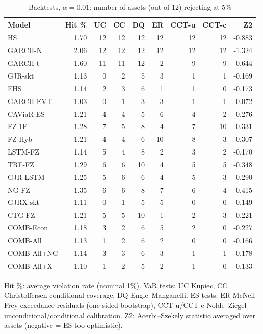 \begin{table}[htbp]
\centering
\footnotesize
\caption{Backtests, $\alpha=0.01$: number of assets (out of 12) rejecting at 5\%}
\label{tab:bt_a010}
\begin{tabular}{lrrrrrrrr}
\toprule
Model & Hit \% & UC & CC & DQ & ER & CCT-u & CCT-c & Z2 \\
\midrule
HS & 1.70 & 12 & 12 & 12 & 12 & 12 & 12 & -0.883 \\
GARCH-N & 2.06 & 12 & 12 & 12 & 12 & 12 & 12 & -1.324 \\
GARCH-t & 1.60 & 11 & 11 & 12 & 2 & 9 & 9 & -0.644 \\
GJR-skt & 1.13 & 0 & 2 & 5 & 3 & 1 & 1 & -0.169 \\
FHS & 1.14 & 2 & 3 & 6 & 1 & 1 & 0 & -0.173 \\
GARCH-EVT & 1.03 & 0 & 1 & 3 & 3 & 1 & 1 & -0.072 \\
CAViaR-ES & 1.21 & 4 & 4 & 5 & 6 & 4 & 2 & -0.276 \\
FZ-1F & 1.28 & 7 & 5 & 8 & 4 & 7 & 10 & -0.331 \\
FZ-Hyb & 1.21 & 4 & 4 & 6 & 10 & 8 & 3 & -0.307 \\
LSTM-FZ & 1.14 & 5 & 4 & 8 & 2 & 3 & 2 & -0.170 \\
TRF-FZ & 1.29 & 6 & 6 & 10 & 4 & 5 & 5 & -0.348 \\
GJR-LSTM & 1.25 & 5 & 6 & 6 & 4 & 5 & 3 & -0.290 \\
NG-FZ & 1.35 & 6 & 6 & 8 & 7 & 6 & 4 & -0.415 \\
GJRX-skt & 1.11 & 0 & 1 & 5 & 5 & 0 & 0 & -0.149 \\
CTG-FZ & 1.21 & 5 & 5 & 10 & 1 & 2 & 3 & -0.221 \\
COMB-Econ & 1.18 & 3 & 2 & 6 & 5 & 2 & 0 & -0.227 \\
COMB-All & 1.13 & 1 & 2 & 6 & 2 & 0 & 0 & -0.166 \\
COMB-All+NG & 1.14 & 3 & 3 & 6 & 3 & 1 & 1 & -0.178 \\
COMB-All+X & 1.10 & 1 & 2 & 5 & 2 & 1 & 0 & -0.133 \\
\bottomrule
\end{tabular}
\par\smallskip\parbox{\linewidth}{\scriptsize Hit \%: average violation rate (nominal 1\%). VaR tests: UC Kupiec, CC Christoffersen conditional coverage, DQ Engle--Manganelli. ES tests: ER McNeil--Frey exceedance residuals (one-sided bootstrap), CCT-u/CCT-c Nolde--Ziegel unconditional/conditional calibration. Z2: Acerbi--Szekely statistic averaged over assets (negative = ES too optimistic).}
\end{table}